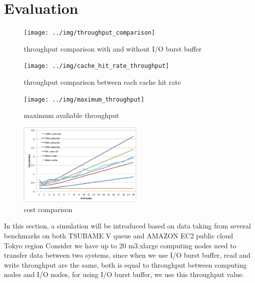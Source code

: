 \section{Evaluation}
\label{sec:evaluation}

\begin{figure}[tb]
	\centering
	\texttt{[image: ../img/throughput\_comparison]}
	\caption{throughput comparison with and without I/O burst buffer}
	\label{throughput comparison}
\end{figure}

\begin{figure}[tb]
	\centering
	\texttt{[image: ../img/cache\_hit\_rate\_throughput]}
	\caption{throughput comparison between each cache hit rate}
	\label{throughput cache rate}
\end{figure}

\begin{figure}[tb]
	\centering
	\texttt{[image: ../img/maximum\_throughput]}
	\caption{maximum avaliable throughput}
	\label{maximum throughput}
\end{figure}

\begin{figure}[tb]
	\centering
	\includegraphics[width=6cm]{../img/cost}
	\caption{cost comparison}
	\label{cost}
\end{figure}


In this section, a simulation will be introduced based on data taking from several benchmarks on both TSUBAME V queue and AMAZON EC2 public cloud Tokyo region%
Consider we have up to 20 m3.xlarge computing nodes need to transfer data between two systems, since when we use I/O burst buffer, read and write throughput are the same, both is equal to throughput between computing nodes and I/O nodes, for using I/O burst buffer, we use this throughput value.


